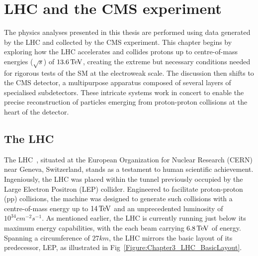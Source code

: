 \chapter{LHC and the CMS experiment}
\thispagestyle{plain}  %
\pagestyle{chapterpages}
\label{Section:Chapter3}

The physics analyses presented in this thesis are performed using data generated by the LHC and collected by the \ac{CMS} experiment. This chapter begins by exploring how the LHC accelerates and collides protons up to centre-of-mass energies ($\sqrt{s}$) of $13.6\,\text{Te\hspace{-.08em}V}$, creating the extreme but necessary conditions needed for rigorous tests of the SM at the electroweak scale. The discussion then shifts to the CMS detector, a multipurpose apparatus composed of several layers of specialised subdetectors. These intricate systems work in concert to enable the precise reconstruction of particles emerging from proton-proton collisions at the heart of the detector.

\section{The LHC}

The LHC~\cite{LHC_1}, situated at the European Organization for Nuclear Research (CERN) near Geneva, Switzerland, stands as a testament to human scientific achievement. Ingeniously, the LHC was placed within the tunnel previously occupied by the Large Electron Positron (LEP) collider. Engineered to facilitate proton-proton (pp) collisions, the machine was designed to generate such collisions with a centre-of-mass energy up to $14\,\text{Te\hspace{-.08em}V}$ and an unprecedented luminosity of $10^{34}\unit{cm}^{-2}\unit{s}^{-1}$. As mentioned earlier, the LHC is currently running just below its maximum energy capabilities, with the each beam carrying $6.8\,\text{Te\hspace{-.08em}V}$ of energy. Spanning a circumference of $27\unit{km}$, the LHC mirrors the basic layout of its predecessor, LEP, as illustrated in Fig~\ref{Figure:Chapter3_LHC_BasicLayout}. 

